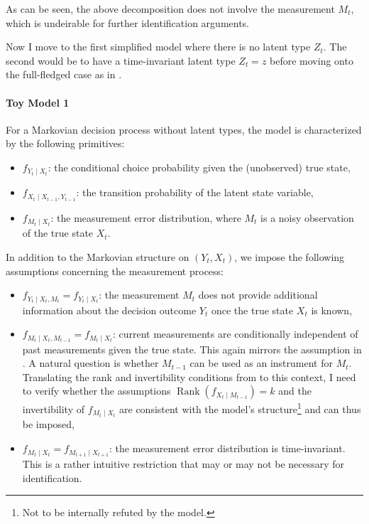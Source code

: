 \documentclass[12pt]{article}
\begin{document}
As can be seen, the above decomposition does not involve the measurement $M_t$, which is undeirable for further identification arguments.

Now I move to the first simplified model where there is no latent type $ Z_t$. The second would be to have a time-invariant latent type $Z_t=z$ before moving onto the full-fledged case as in \citet{todd2020dynamic}.

\paragraph{Toy Model 1} For a Markovian decision process without latent types, the model is characterized by the following primitives:
\begin{itemize}
    \item $f_{Y_t \mid X_t}$: the conditional choice probability given the (unobserved) true state,
    \item $f_{X_t \mid X_{t-1}, Y_{t-1}}$: the transition probability of the latent state variable,
    \item $f_{M_t \mid X_t}$: the measurement error distribution, where $M_t$ is a noisy observation of the true state $X_t$.
\end{itemize}

In addition to the Markovian structure on $(Y_t, X_t)$, we impose the following assumptions concerning the measurement process:
\begin{itemize}
    \item $f_{Y_t \mid X_t, M_t} = f_{Y_t \mid X_t}$: the measurement $M_t$ does not provide additional information about the decision outcome $Y_t$ once the true state $X_t$ is known,
    \item $f_{M_t \mid X_t, M_{t-1}} = f_{M_t \mid X_t}$: current measurements are conditionally independent of past measurements given the true state. This again mirrors the assumption in \citet{hu2008identification}. A natural question is whether $M_{t-1}$ can be used as an instrument for $M_t$. Translating the rank and invertibility conditions from \citet{hu2008identification} to this context, I need to verify whether the assumptions $\operatorname{Rank}(f_{X_t \mid M_{t-1}}) = k$ and the invertibility of $f_{M_t \mid X_t}$ are consistent with the model’s structure\footnote{Not to be internally refuted by the model.} and can thus be imposed,
    \item $f_{M_t \mid X_t} = f_{M_{t+1} \mid X_{t+1}}$: the measurement error distribution is time-invariant. This is a rather intuitive restriction that may or may not be necessary for identification.
\end{itemize}
\end{document}

